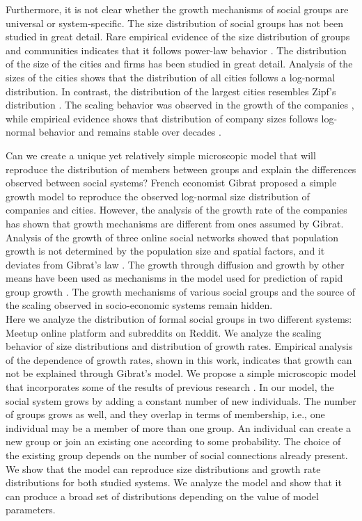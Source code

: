 Furthermore, it is not clear whether the growth mechanisms of social groups are universal or system-specific. The size distribution of social groups has not been studied in great detail. Rare empirical evidence of the size distribution of groups and communities indicates that it follows power-law behavior \cite{zheleva2009co}. The distribution of the size of the cities and firms has been studied in great detail. Analysis of the sizes of the cities shows that the distribution of all cities follows a log-normal distribution. In contrast, the distribution of the largest cities resembles Zipf's distribution \cite{fazio2015pareto}. The scaling behavior was observed in the growth of the companies \cite{stanley1996scaling}, while empirical evidence shows that distribution of company sizes follows log-normal behavior and remains stable over decades \cite{amaral1997scaling}. 

Can we create a unique yet relatively simple microscopic model that will reproduce the distribution of members between groups and explain the differences observed between social systems? French economist Gibrat proposed a simple growth model to reproduce the observed log-normal size distribution of companies and cities. However, the analysis of the growth rate of the companies \cite{amaral1997scaling} has shown that growth mechanisms are different from ones assumed by Gibrat. Analysis of the growth of three online social networks showed that population growth is not determined by the population size and spatial factors, and it deviates from Gibrat's law \cite{zhu2014online}. The growth through diffusion and growth by other means have been used as mechanisms in the model used for prediction of rapid group growth \cite{kairam2012life}. The growth mechanisms of various social groups and the source of the scaling observed in socio-economic systems remain hidden.\\

Here we analyze the distribution of formal social groups in two different systems: Meetup online platform and subreddits on Reddit. We analyze the scaling behavior of size distributions and distribution of growth rates. Empirical analysis of the dependence of growth rates, shown in this work, indicates that growth can not be explained through Gibrat's model. We propose a simple microscopic model that incorporates some of the results of previous research \cite{backstrom2006group, zheleva2009co}. In our model, the social system grows by adding a constant number of new individuals. The number of groups grows as well, and they overlap in terms of membership, i.e., one individual may be a member of more than one group. An individual can create a new group or join an existing one according to some probability. The choice of the existing group depends on the number of social connections already present. We show that the model can reproduce size distributions and growth rate distributions for both studied systems. We analyze the model and show that it can produce a broad set of distributions depending on the value of model parameters.\\

